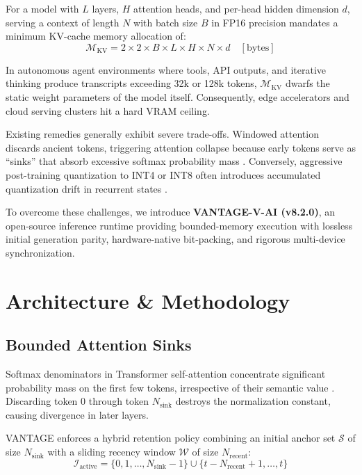 \documentclass[10pt,twocolumn,letterpaper]{article}
\begin{document}
For a model with $L$ layers, $H$ attention heads, and per-head hidden dimension $d$, serving a context of length $N$ with batch size $B$ in FP16 precision mandates a minimum KV-cache memory allocation of:
\begin{equation}
\mathcal{M}_{\text{KV}} = 2 \times 2 \times B \times L \times H \times N \times d \quad [\text{bytes}]
\end{equation}

In autonomous agent environments where tools, API outputs, and iterative thinking produce transcripts exceeding 32k or 128k tokens, $\mathcal{M}_{\text{KV}}$ dwarfs the static weight parameters of the model itself. Consequently, edge accelerators and cloud serving clusters hit a hard VRAM ceiling.

Existing remedies generally exhibit severe trade-offs. Windowed attention discards ancient tokens, triggering attention collapse because early tokens serve as ``sinks'' that absorb excessive softmax probability mass \cite{xiao2024streamingllm}. Conversely, aggressive post-training quantization to INT4 or INT8 often introduces accumulated quantization drift in recurrent states \cite{liu2024kvquant}.

To overcome these challenges, we introduce \textbf{VANTAGE-V-AI (v8.2.0)}, an open-source inference runtime providing bounded-memory execution with lossless initial generation parity, hardware-native bit-packing, and rigorous multi-device synchronization.

\section{Architecture \& Methodology}

\subsection{Bounded Attention Sinks}
Softmax denominators in Transformer self-attention concentrate significant probability mass on the first few tokens, irrespective of their semantic value \cite{xiao2024streamingllm}. Discarding token 0 through token $N_{\text{sink}}$ destroys the normalization constant, causing divergence in later layers.

VANTAGE enforces a hybrid retention policy combining an initial anchor set $\mathcal{S}$ of size $N_{\text{sink}}$ with a sliding recency window $\mathcal{W}$ of size $N_{\text{recent}}$:
\begin{equation}
\mathcal{I}_{\text{active}} = \{0, 1, \dots, N_{\text{sink}}-1\} \cup \{t - N_{\text{recent}} + 1, \dots, t\}
\end{equation}
\end{document}
